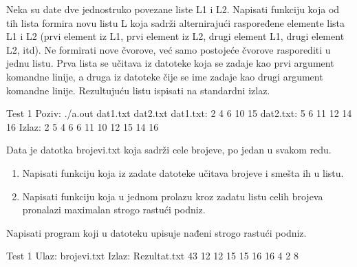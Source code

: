 



\begin{Exercise}[label=609]
Neka su date dve jednostruko povezane liste L1 i L2. Napisati funkciju koja od 
tih lista formira novu listu L koja sadrži alternirajući raspoređene elemente 
lista L1 i L2 (prvi element iz L1, prvi element iz L2, drugi element L1,
drugi element L2, itd). Ne formirati nove čvorove, već samo postojeće čvorove 
rasporediti u jednu listu. Prva lista se učitava iz datoteke koja se zadaje 
kao prvi argument komandne linije, a druga iz datoteke čije se ime zadaje kao 
drugi argument komandne linije. Rezultujuću listu ispisati 
na standardni izlaz. 

\begin{miditest}
  \begin{test}{Test 1}
Poziv: ./a.out dat1.txt dat2.txt
dat1.txt: 2 4 6 10 15
dat2.txt: 5 6 11 12 14 16
Izlaz:  2 5 4 6 6 11 10 12 15 14 16
  \end{test}
\end{miditest}

\end{Exercise}
\begin{Answer}[ref=609]
\end{Answer}



\begin{Exercise}[label=610]
Data je datotka brojevi.txt koja sadrži cele brojeve, po jedan u svakom redu.
\begin{enumerate}
 \item Napisati funkciju koja iz zadate datoteke učitava brojeve i smešta ih u listu.
 \item Napisati funkciju koja u jednom prolazu kroz zadatu listu celih brojeva 
pronalazi maximalan strogo rastući podniz.
\end{enumerate}
Napisati program koji u datoteku  upisuje nađeni strogo rastući podniz.

\begin{maxitest}
  \begin{test}{Test 1}
Ulaz:  brojevi.txt       Izlaz: Rezultat.txt
       43                            12
       12                            15
       15                            16
       16
       4
       2
       8
  \end{test}
\end{maxitest}

\end{Exercise}
\begin{Answer}[ref=610]
\end{Answer}




